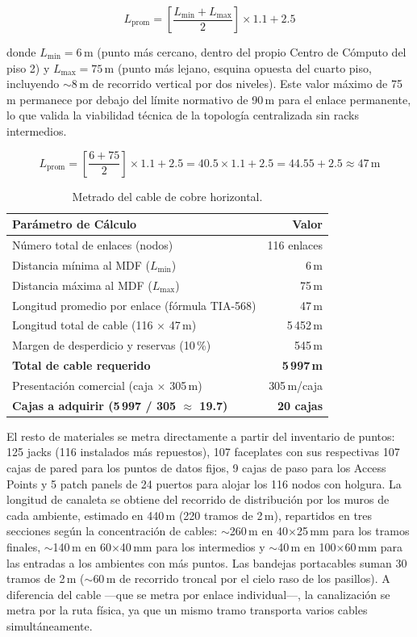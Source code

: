 \[
L_{\text{prom}} = \left[\frac{L_{\min} + L_{\max}}{2}\right] \times 1.1 + 2.5
\]

\noindent donde $L_{\min} = 6$\,m (punto más cercano, dentro del propio Centro de Cómputo del piso 2) y $L_{\max} = 75$\,m (punto más lejano, esquina opuesta del cuarto piso, incluyendo $\sim$8\,m de recorrido vertical por dos niveles). Este valor máximo de 75\,m permanece por debajo del límite normativo de 90\,m para el enlace permanente, lo que valida la viabilidad técnica de la topología centralizada sin racks intermedios.

\[
L_{\text{prom}} = \left[\frac{6 + 75}{2}\right] \times 1.1 + 2.5 = 40.5 \times 1.1 + 2.5 = 44.55 + 2.5 \approx 47\,\text{m}
\]

\begin{table}[H]
\centering
\caption{Metrado del cable de cobre horizontal.}
\label{tab:metrado_cable}
\begin{tabular}{lr}
\hline
\textbf{Parámetro de Cálculo} & \textbf{Valor} \\
\hline
Número total de enlaces (nodos)                          & 116 enlaces \\
Distancia mínima al MDF ($L_{\min}$)                     & 6\,m \\
Distancia máxima al MDF ($L_{\max}$)                     & 75\,m \\
Longitud promedio por enlace (fórmula TIA-568)           & 47\,m \\
Longitud total de cable (116 $\times$ 47\,m)             & 5\,452\,m \\
Margen de desperdicio y reservas (10\,\%)                & 545\,m \\
\hline
\textbf{Total de cable requerido}                        & \textbf{5\,997\,m} \\
Presentación comercial (caja $\times$ 305\,m)            & 305\,m/caja \\
\textbf{Cajas a adquirir (5\,997 / 305 $\approx$ 19.7)} & \textbf{20 cajas} \\
\hline
\end{tabular}
\end{table}

\noindent El resto de materiales se metra directamente a partir del inventario de puntos: 125 jacks (116 instalados más repuestos), 107 faceplates con sus respectivas 107 cajas de pared para los puntos de datos fijos, 9 cajas de paso para los Access Points y 5 patch panels de 24 puertos para alojar los 116 nodos con holgura. La longitud de canaleta se obtiene del recorrido de distribución por los muros de cada ambiente, estimado en 440\,m (220 tramos de 2\,m), repartidos en tres secciones según la concentración de cables: $\sim$260\,m en 40$\times$25\,mm para los tramos finales, $\sim$140\,m en 60$\times$40\,mm para los intermedios y $\sim$40\,m en 100$\times$60\,mm para las entradas a los ambientes con más puntos. Las bandejas portacables suman 30 tramos de 2\,m ($\sim$60\,m de recorrido troncal por el cielo raso de los pasillos). A diferencia del cable ---que se metra por enlace individual---, la canalización se metra por la ruta física, ya que un mismo tramo transporta varios cables simultáneamente.

